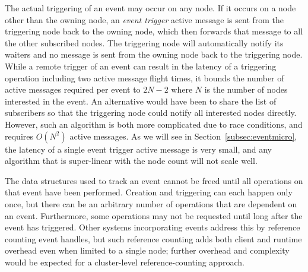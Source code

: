 The actual triggering of an event may occur on any node.  If it occurs on a node other than the owning
node, an {\em event trigger} active message is sent from the triggering node back to the owning node, which
then forwards that message to all the other subscribed nodes.  The triggering node will automatically
notify its waiters and no message is sent from the owning node back to the triggering node.
While a remote trigger of an event can result in
the latency of a triggering operation including two active message flight times, it bounds the number of active
messages required per event to $2N-2$ where $N$ is the number of nodes 
interested in the event.  An alternative
would have been to share the list of subscribers so that the triggering node could notify all interested
nodes directly.  However, such an algorithm is both more complicated due to race conditions, and requires $O(N^2)$
active messages.  As we will see in Section~\ref{subsec:eventmicro}, the latency of a single event trigger
active message is very small, and any algorithm that is super-linear with the node count will not scale well.

The data structures used to track an event cannot be freed until all operations on that event have been
performed.  Creation and triggering can each happen only once, but there can be an arbitrary number of operations
that are dependent on an event.   Furthermore, some operations may not be requested until long after the
event has triggered.  Other systems incorporating events address this by reference counting event
handles\cite{Khronos:OpenCL}, but such reference counting adds both client and runtime overhead even when
limited to a single node; further overhead and complexity would be expected for a cluster-level
reference-counting approach.

